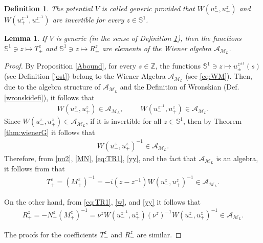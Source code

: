 \documentclass[12pt,oneside,onecolumn,open]{article}
\newtheorem{defi}[teo]{Definition}
\newtheorem{lema}[teo]{Lemma}
\begin{document}
 \begin{defi}\label{generic}
     The potential $V$ is called generic provided that $W(u_-^{z}, u_+^{z})$ and $W(u_+^{z^{-1}}, u_-^{z^{-1}})$ are invertible for every $z \in \mathbb{S}^{1}$.
 \end{defi}
\color{black}

    
   
   \begin{lema} \label{y3}If  $V$ is generic (in the sense of Definition \ref{generic}), then the functions $\mathbb{S}^{1}\ni z\mapsto T_{\pm}^{z}$ and $\mathbb{S}^{1}\ni z\mapsto R_{\pm}^{z}$ are elements of the Wiener algebra $  \mathcal{A}_{\mathcal{M}_L} $.
   \end{lema}
   \begin{proof}
       By Proposition \ref{Abound}, for every $ s \in \mathbb{Z} $, the functions $  \mathbb{S}^{1}\ni z \mapsto u^{z^{\pm 1}}_{\pm}(s)$
(see Definition \ref{jost}) belong to the Wiener Algebra $   \mathcal{A}_{\mathcal{M}_L}  $ (see \eqref{eq:WM}). Then, due to the algebra structure of \(  \mathcal{A}_{\mathcal{M}_L}  \) and the Definition of Wronskian (Def. \ref{wronskidefi}), it follows that
\begin{align}\label{w}
    W(u_-^{z}, u_+^{z})\in  \mathcal{A}_{\mathcal{M}_L} , \hspace{1cm}
   W(u_- ^{z^{-1}}, u_+ ^{z})\in  \mathcal{A}_{\mathcal{M}_L} .
\end{align}
Since \( W(u_-^{z}, u_+^{z})\in  \mathcal{A}_{\mathcal{M}_L}  \), if it is invertible for all \( z\in \mathbb{S}^{1} \), then by Theorem \ref{thm:wienerG} it follows that  
\begin{align}\label{yy}
W(u_-^{z}, u_+^{z})^{-1}\in \mathcal{A}_{\mathcal{M}_L} .
\end{align}
Therefore, from \eqref{nu2}, \eqref{MN}, \eqref{eq:TR1},  \eqref{yy}, and the 
 fact that $\mathcal{A}_{\mathcal{M}_L}$ is an algebra, it follows from that 
\begin{align}
    T_{+}^{z}=(M_+^{z})^{-1}= -i (z - z^{-1}) W(u_-^{z}, u_+^{z})^{-1}\in  \mathcal{A}_{\mathcal{M}_L} .
\end{align}

On the other hand, from \eqref{eq:TR1}, \eqref{w}, and \eqref{yy} it follows that 
\begin{align}
    R_{+}^{z}=-N_{+}^{z} (M_+^{z})^{-1}= \nu^z W(u_- ^{z^{-1}}, u_+ ^{z}) (\nu^z)^{-1}  W(u_-^{z}, u_+^{z})^{-1}
    \in  \mathcal{A}_{\mathcal{M}_L} .
\end{align}

The proofs for the coefficients \( T_{-}^{z} \) and \( R_{-}^{z} \) are similar.
   \end{proof}
   
\end{document}

